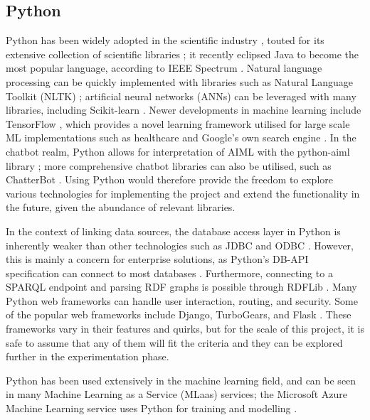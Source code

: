 \subsection{Python}
Python has been widely adopted in the scientific industry \cite{bird2009natural}, touted for its extensive collection of scientific libraries \cite{koepke2011python}; it recently eclipsed Java to become the most popular language, according to IEEE Spectrum \cite{cass2019}. Natural language processing can be quickly implemented with libraries such as Natural Language Toolkit (NLTK) \cite{nltk2019}; artificial neural networks (ANNs) can be leveraged with many libraries, including Scikit-learn \cite{pedregosa2011scikit}. Newer developments in machine learning include TensorFlow \cite{abadi2016tensorflow}, which provides a novel learning framework utilised for large scale ML implementations such as healthcare \cite{polzin2019} and Google’s own search engine \cite{pichai2015}. In the chatbot realm, Python allows for interpretation of AIML with the python-aiml library \cite{villegas2019}; more comprehensive chatbot libraries can also be utilised, such as ChatterBot \cite{cox2019}. Using Python would therefore provide the freedom to explore various technologies for implementing the project and extend the functionality in the future, given the abundance of relevant libraries.

In the context of linking data sources, the database access layer in Python is inherently weaker than other technologies such as JDBC and ODBC \cite{vermuelen2019}. However, this is mainly a concern for enterprise solutions, as Python’s DB-API specification can connect to most databases \cite{python2017db}. Furthermore, connecting to a SPARQL endpoint and parsing RDF graphs is possible through RDFLib \cite{rdf2019}. Many Python web frameworks can handle user interaction, routing, and security. Some of the popular web frameworks include Django, TurboGears, and Flask \cite{python2020web}. These frameworks vary in their features and quirks, but for the scale of this project, it is safe to assume that any of them will fit the criteria and they can be explored further in the experimentation phase.

Python has been used extensively in the machine learning field, and can be seen in many Machine Learning as a Service (MLaas) services; the Microsoft Azure Machine Learning service uses Python for training and modelling \cite{microsoft2019azure}. 

